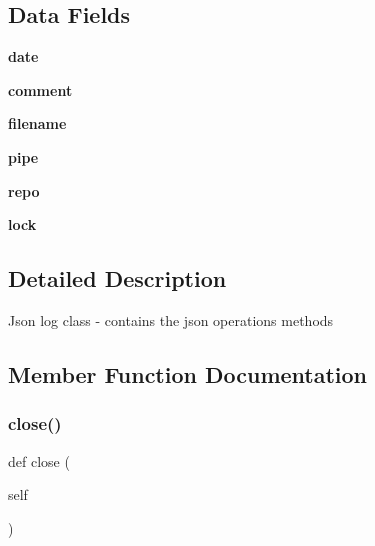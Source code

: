 \subsection*{Data Fields}
\begin{DoxyCompactItemize}
\item 
\mbox{\label{classjson_logs_1_1json_logs_ade6a701b82b93dfb7eae4e79cd3b18a6}} 
{\bfseries date}
\item 
\mbox{\label{classjson_logs_1_1json_logs_a8c0288707ed90c2275d70e22bd1f16d9}} 
{\bfseries comment}
\item 
\mbox{\label{classjson_logs_1_1json_logs_a2ff994e16bf9521154de4cf659a3b689}} 
{\bfseries filename}
\item 
\mbox{\label{classjson_logs_1_1json_logs_a62849234f53973891144547e2076030a}} 
{\bfseries pipe}
\item 
\mbox{\label{classjson_logs_1_1json_logs_a4f69d305a71aad1db266a8447901389c}} 
{\bfseries repo}
\item 
\mbox{\label{classjson_logs_1_1json_logs_af1b662fe6ae53fbcd5a505235805d788}} 
{\bfseries lock}
\end{DoxyCompactItemize}


\subsection{Detailed Description}
\begin{DoxyVerb}Json log class - contains the json operations methods\end{DoxyVerb}
 

\subsection{Member Function Documentation}
\mbox{\label{classjson_logs_1_1json_logs_a8639372c33e15084a7f7c4d9d87b7bfe}} 
\subsubsection{\texorpdfstring{close()}{close()}}
{\footnotesize\ttfamily def close (\begin{DoxyParamCaption}\item[{}]{self }\end{DoxyParamCaption})}

